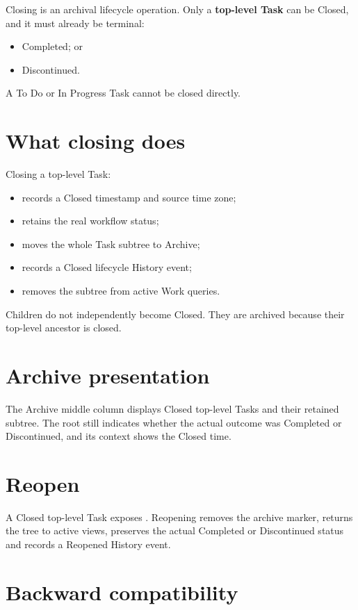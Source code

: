 \documentclass{testudomanual}
\begin{document}
Closing is an archival lifecycle operation. Only a \textbf{top-level Task} can be Closed, and it must already be terminal:
\begin{itemize}
    \item Completed; or
    \item Discontinued.
\end{itemize}

A To Do or In Progress Task cannot be closed directly.

\section{What closing does}

Closing a top-level Task:
\begin{itemize}
    \item records a Closed timestamp and source time zone;
    \item retains the real workflow status;
    \item moves the whole Task subtree to Archive;
    \item records a Closed lifecycle History event;
    \item removes the subtree from active Work queries.
\end{itemize}

Children do not independently become Closed. They are archived because their top-level ancestor is closed.

\section{Archive presentation}

The Archive middle column displays Closed top-level Tasks and their retained subtree. The root still indicates whether the actual outcome was Completed or Discontinued, and its context shows the Closed time.

\section{Reopen}

A Closed top-level Task exposes . Reopening removes the archive marker, returns the tree to active views, preserves the actual Completed or Discontinued status and records a Reopened History event.

\section{Backward compatibility}
\end{document}
